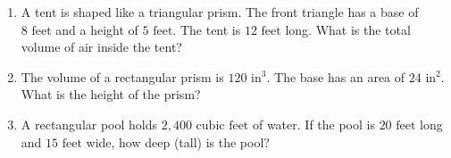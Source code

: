 \documentclass[12pt, letterpaper, fleqn]{article}
\begin{document}
\vspace{3mm}

\begin{enumerate}[itemsep=2.5cm, leftmargin=0.6cm, resume]
\item A tent is shaped like a triangular prism. The front triangle has a base of $8\text{ feet}$ and a height of $5\text{ feet}$. The tent is $12\text{ feet}$ long. What is the total volume of air inside the tent?
\item The volume of a rectangular prism is $120\text{ in}^3$. The base has an area of $24\text{ in}^2$. What is the height of the prism?
\item A rectangular pool holds $2,400\text{ cubic feet}$ of water. If the pool is $20\text{ feet}$ long and $15\text{ feet}$ wide, how deep (tall) is the pool?
\end{enumerate}
\end{document}
